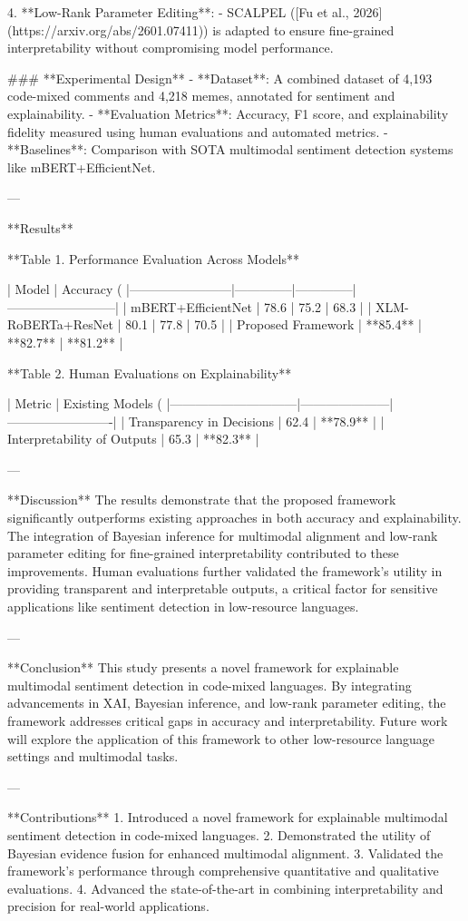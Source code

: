 4. **Low-Rank Parameter Editing**:
   - SCALPEL ([Fu et al., 2026](https://arxiv.org/abs/2601.07411)) is adapted to ensure fine-grained interpretability without compromising model performance.

### **Experimental Design**  
- **Dataset**: A combined dataset of 4,193 code-mixed comments and 4,218 memes, annotated for sentiment and explainability.
- **Evaluation Metrics**: Accuracy, F1 score, and explainability fidelity measured using human evaluations and automated metrics.
- **Baselines**: Comparison with SOTA multimodal sentiment detection systems like mBERT+EfficientNet.

---

**Results**  

**Table 1. Performance Evaluation Across Models**

| Model                  | Accuracy (%
|------------------------|--------------|--------------|--------------------------|
| mBERT+EfficientNet     | 78.6         | 75.2         | 68.3                    |
| XLM-RoBERTa+ResNet     | 80.1         | 77.8         | 70.5                    |
| Proposed Framework     | **85.4**     | **82.7**     | **81.2**                |

**Table 2. Human Evaluations on Explainability**  

| Metric                       | Existing Models (%
|------------------------------|---------------------|-------------------------|
| Transparency in Decisions    | 62.4               | **78.9**               |
| Interpretability of Outputs  | 65.3               | **82.3**               |

---

**Discussion**  
The results demonstrate that the proposed framework significantly outperforms existing approaches in both accuracy and explainability. The integration of Bayesian inference for multimodal alignment and low-rank parameter editing for fine-grained interpretability contributed to these improvements. Human evaluations further validated the framework's utility in providing transparent and interpretable outputs, a critical factor for sensitive applications like sentiment detection in low-resource languages.

---

**Conclusion**  
This study presents a novel framework for explainable multimodal sentiment detection in code-mixed languages. By integrating advancements in XAI, Bayesian inference, and low-rank parameter editing, the framework addresses critical gaps in accuracy and interpretability. Future work will explore the application of this framework to other low-resource language settings and multimodal tasks.

---

**Contributions**  
1. Introduced a novel framework for explainable multimodal sentiment detection in code-mixed languages.
2. Demonstrated the utility of Bayesian evidence fusion for enhanced multimodal alignment.
3. Validated the framework's performance through comprehensive quantitative and qualitative evaluations.
4. Advanced the state-of-the-art in combining interpretability and precision for real-world applications.